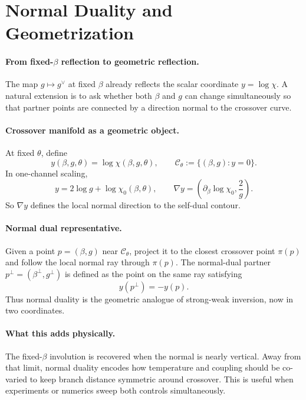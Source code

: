 \section{Normal Duality and Geometrization}
\label{sec:normal_duality}

\paragraph{From fixed-\(\beta\) reflection to geometric reflection.}
The map \(g\mapsto g^\vee\) at fixed \(\beta\) already reflects the scalar coordinate
\(y=\log\chi\).
A natural extension is to ask whether both \(\beta\) and \(g\) can change simultaneously so that
partner points are connected by a direction normal to the crossover curve.

\paragraph{Crossover manifold as a geometric object.}
At fixed \(\theta\), define
\begin{equation}
  y(\beta,g,\theta)=\log\chi(\beta,g,\theta),
  \qquad
  \mathcal{C}_\theta:=\{(\beta,g):y=0\}.
\end{equation}
In one-channel scaling,
\begin{equation}
  y=2\log g+\log\chi_0(\beta,\theta),
  \qquad
  \nabla y=\left(\partial_\beta\log\chi_0,\frac{2}{g}\right).
\end{equation}
So \(\nabla y\) defines the local normal direction to the self-dual contour.

\paragraph{Normal dual representative.}
Given a point \(p=(\beta,g)\) near \(\mathcal{C}_\theta\), project it to the closest crossover
point \(\pi(p)\) and follow the local normal ray through \(\pi(p)\).
The normal-dual partner \(p^\perp=(\beta^\perp,g^\perp)\) is defined as the point on the same ray
satisfying
\begin{equation}
  y(p^\perp)=-y(p).
\end{equation}
Thus normal duality is the geometric analogue of strong-weak inversion, now in two coordinates.

\paragraph{What this adds physically.}
The fixed-\(\beta\) involution is recovered when the normal is nearly vertical.
Away from that limit, normal duality encodes how temperature and coupling should be co-varied to keep
branch distance symmetric around crossover.
This is useful when experiments or numerics sweep both controls simultaneously.

